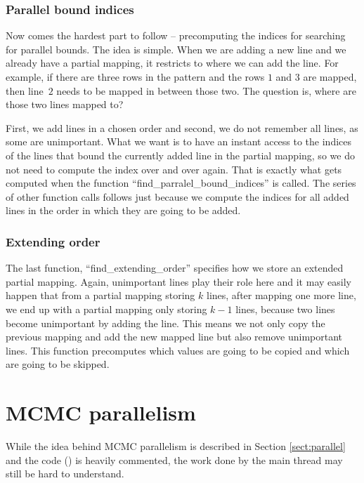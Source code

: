 \subsubsection{Parallel bound indices}
Now comes the hardest part to follow -- precomputing the indices for searching for parallel bounds. The idea is simple. When we are adding a new line and we already have a partial mapping, it restricts to where we can add the line. For example, if there are three rows in the pattern and the rows $1$ and $3$ are mapped, then line~$2$ needs to be mapped in between those two. The question is, where are those two lines mapped to?

First, we add lines in a chosen order and second, we do not remember all lines, as some are unimportant. What we want is to have an instant access to the indices of the lines that bound the currently added line in the partial mapping, so we do not need to compute the index over and over again. That is exactly what gets computed when the function ``find\_parralel\_bound\_indices'' is called. The series of other function calls follows just because we compute the indices for all added lines in the order in which they are going to be added.

\subsubsection{Extending order}
The last function, ``find\_extending\_order'' specifies how we store an extended partial mapping. Again, unimportant lines play their role here and it may easily happen that from a partial mapping storing $k$ lines, after mapping one more line, we end up with a partial mapping only storing $k-1$ lines, because two lines become unimportant by adding the line. This means we not only copy the previous mapping and add the new mapped line but also remove unimportant lines. This function precomputes which values are going to be copied and which are going to be skipped.

\section{MCMC parallelism}
While the idea behind MCMC parallelism is described in Section \ref{sect:parallel} and the code (\cite{program}) is heavily commented, the work done by the main thread may still be hard to understand.

